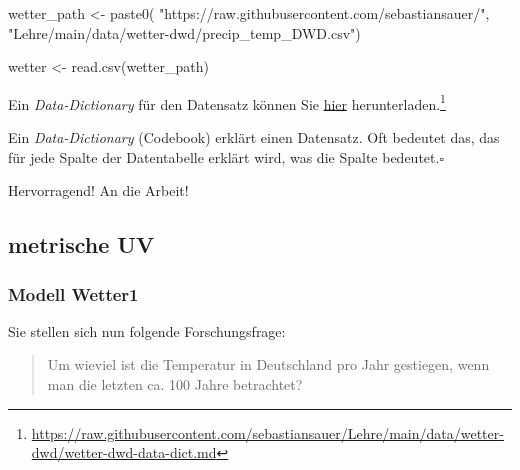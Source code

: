 \documentclass[
  letterpaper,
]{scrbook}
\newenvironment{Shaded}{\begin{snugshade}}{\end{snugshade}}
\newcommand{\FunctionTok}[1]{\textcolor[rgb]{0.28,0.35,0.67}{#1}}
\newcommand{\NormalTok}[1]{\textcolor[rgb]{0.00,0.23,0.31}{#1}}
\newcommand{\OtherTok}[1]{\textcolor[rgb]{0.00,0.23,0.31}{#1}}
\newcommand{\StringTok}[1]{\textcolor[rgb]{0.13,0.47,0.30}{#1}}
\theoremstyle{definition}
\theoremstyle{definition}
\theoremstyle{definition}
\theoremstyle{remark}
\begin{document}
\begin{Shaded}
\begin{Highlighting}[]
\NormalTok{wetter\_path }\OtherTok{\textless{}{-}} \FunctionTok{paste0}\NormalTok{(}
  \StringTok{"https://raw.githubusercontent.com/sebastiansauer/"}\NormalTok{,}
  \StringTok{"Lehre/main/data/wetter{-}dwd/precip\_temp\_DWD.csv"}\NormalTok{)}

\NormalTok{wetter }\OtherTok{\textless{}{-}} \FunctionTok{read.csv}\NormalTok{(wetter\_path)}
\end{Highlighting}
\end{Shaded}

Ein \emph{Data-Dictionary} für den Datensatz können Sie
\href{https://raw.githubusercontent.com/sebastiansauer/Lehre/main/data/wetter-dwd/wetter-dwd-data-dict.md}{hier}
herunterladen.\footnote{\url{https://raw.githubusercontent.com/sebastiansauer/Lehre/main/data/wetter-dwd/wetter-dwd-data-dict.md}}

\begin{tcolorbox}[enhanced jigsaw, colbacktitle=quarto-callout-note-color!10!white, coltitle=black, bottomrule=.15mm, rightrule=.15mm, arc=.35mm, toptitle=1mm, colframe=quarto-callout-note-color-frame, opacitybacktitle=0.6, left=2mm, leftrule=.75mm, breakable, opacityback=0, bottomtitle=1mm, titlerule=0mm, title=\textcolor{quarto-callout-note-color}{\faInfo}\hspace{0.5em}{Hinweis}, colback=white, toprule=.15mm]

Ein \emph{Data-Dictionary} (Codebook) erklärt einen Datensatz. Oft
bedeutet das, das für jede Spalte der Datentabelle erklärt wird, was die
Spalte bedeutet.\(\square\)

\end{tcolorbox}

Hervorragend! An die Arbeit!

\subsection{metrische UV}\label{metrische-uv}

\subsubsection{Modell Wetter1}\label{modell-wetter1}

Sie stellen sich nun folgende Forschungsfrage:

\begin{quote}
{} Um wieviel ist die Temperatur in Deutschland pro Jahr
gestiegen, wenn man die letzten ca. 100 Jahre betrachtet?
\end{quote}
\end{document}
